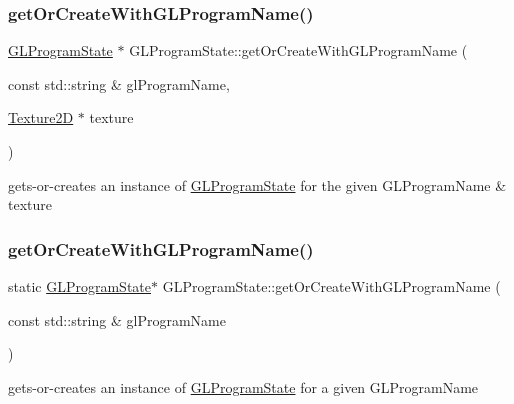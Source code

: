\subsubsection{\texorpdfstring{get\+Or\+Create\+With\+G\+L\+Program\+Name()}{getOrCreateWithGLProgramName()}\hspace{0.1cm}{\footnotesize\ttfamily [2/4]}}
{\footnotesize\ttfamily \hyperlink{classGLProgramState}{G\+L\+Program\+State} $\ast$ G\+L\+Program\+State\+::get\+Or\+Create\+With\+G\+L\+Program\+Name (\begin{DoxyParamCaption}\item[{const std\+::string \&}]{gl\+Program\+Name,  }\item[{\hyperlink{classTexture2D}{Texture2D} $\ast$}]{texture }\end{DoxyParamCaption})\hspace{0.3cm}{\ttfamily [static]}}

gets-\/or-\/creates an instance of \hyperlink{classGLProgramState}{G\+L\+Program\+State} for the given G\+L\+Program\+Name \& texture \mbox{\label{classGLProgramState_a6d2b036d98c2f9490d969b059448147d}} 
\subsubsection{\texorpdfstring{get\+Or\+Create\+With\+G\+L\+Program\+Name()}{getOrCreateWithGLProgramName()}\hspace{0.1cm}{\footnotesize\ttfamily [3/4]}}
{\footnotesize\ttfamily static \hyperlink{classGLProgramState}{G\+L\+Program\+State}$\ast$ G\+L\+Program\+State\+::get\+Or\+Create\+With\+G\+L\+Program\+Name (\begin{DoxyParamCaption}\item[{const std\+::string \&}]{gl\+Program\+Name }\end{DoxyParamCaption})\hspace{0.3cm}{\ttfamily [static]}}

gets-\/or-\/creates an instance of \hyperlink{classGLProgramState}{G\+L\+Program\+State} for a given G\+L\+Program\+Name \mbox{\label{classGLProgramState_a3d2d47637176741d4d4c9a372a8fdf95}} 

